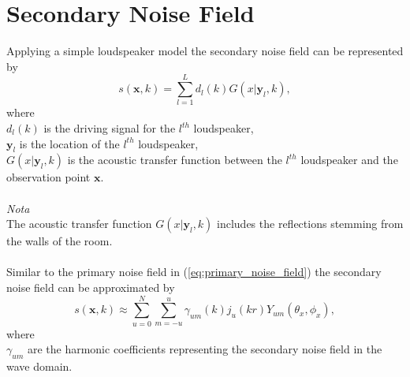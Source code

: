 \section{Secondary Noise Field}
Applying a simple loudspeaker model the secondary noise field can be represented by \cite{Zhang2019}
\begin{equation}
    s(\mathbf{x},k) = \sum_{l=1}^Ld_l(k)G(x|\mathbf{y}_l,k),
    \label{eq:secondary_noise_field_atf}
\end{equation}
where\\
$d_l(k)$ is the driving signal for the $l^{th}$ loudspeaker,\\
$\mathbf{y}_l$ is the location of the $l^{th}$ loudspeaker,\\
$G(x|\mathbf{y}_l,k)$ is the acoustic transfer function between the $l^{th}$ loudspeaker and the observation point $\mathbf{x}$.\\\\
\textit{Nota}\\
The acoustic transfer function $G(x|\mathbf{y}_l,k)$ includes the reflections stemming from the walls of the room.\\\\
Similar to the primary noise field in (\ref{eq:primary_noise_field}) the secondary noise field can be approximated by
\begin{equation}
    s(\mathbf{x},k) \approx \sum_{u=0}^N \sum_{m=-u}^u\gamma_{um}(k)j_u(kr)Y_{um}(\theta_x,\phi_x),
    \label{eq:secondary_noise_field}
\end{equation}
where\\
$\gamma_{um}$ are the harmonic coefficients representing the secondary noise field in the wave domain.\\\\

